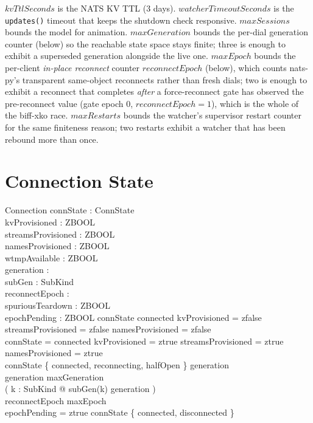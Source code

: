 \documentclass[a4paper,10pt,fleqn]{article}
\begin{document}
$kvTtlSeconds$ is the NATS KV TTL (3 days).
$watcherTimeoutSeconds$ is the \texttt{updates()} timeout that
keeps the shutdown check responsive.  $maxSessions$ bounds the
model for animation.  $maxGeneration$ bounds the per-dial
generation counter (below) so the reachable state space stays
finite; three is enough to exhibit a superseded generation
alongside the live one.  $maxEpoch$ bounds the per-client
\emph{in-place reconnect} counter $reconnectEpoch$ (below), which
counts nats-py's transparent same-object reconnects rather than
fresh dials; two is enough to exhibit a reconnect that completes
\emph{after} a force-reconnect gate has observed the pre-reconnect
value (gate epoch $0$, $reconnectEpoch = 1$), which is the whole
of the biff-xko race.  $maxRestarts$ bounds the watcher's supervisor
restart counter for the same finiteness reason; two restarts exhibit a
watcher that has been rebound more than once.

\section{Connection State}

\begin{schema}{Connection}
  connState : ConnState \\
  kvProvisioned : ZBOOL \\
  streamsProvisioned : ZBOOL \\
  namesProvisioned : ZBOOL \\
  wtmpAvailable : ZBOOL \\
  generation : \nat \\
  subGen : SubKind \fun \nat \\
  reconnectEpoch : \nat \\
  spuriousTeardown : ZBOOL \\
  epochPending : ZBOOL
  \where
  connState \neq connected \implies
  kvProvisioned = zfalse \land
  streamsProvisioned = zfalse \land
  namesProvisioned = zfalse \\
  connState = connected \implies
  kvProvisioned = ztrue \land
  streamsProvisioned = ztrue \land
  namesProvisioned = ztrue \\
  connState \in \{ connected, reconnecting, halfOpen \} \implies
  generation  \\
  generation \leq maxGeneration \\
  ( \forall k : SubKind @ subGen(k) \leq generation ) \\
  reconnectEpoch \leq maxEpoch \\
  epochPending = ztrue \implies
  connState \in \{ connected, disconnected \}
\end{schema}
\end{document}

